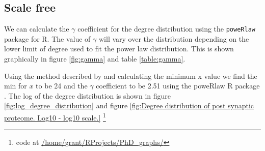 \subsection{Scale free}
We can calculate the $\gamma$ coefficient for the degree distribution using the \texttt{poweRlaw} package for R. The value of $\gamma$ will vary over the distribution depending on the lower limit of degree used to fit the power law distribution. This is shown graphically in figure \ref{fig:gamma} and table \ref{table:gamma}.

Using the method described by \cite{clauset2009power} and calculating the minimum x value we find the min for $x$ to be 24 and the $\gamma$ coefficient to be 2.51 using the poweRlaw R package \cite{gillespie2015fitting}. The log of the degree distribution is shown in figure \ref{fig:log_degree_distribution} and figure \ref{fig:Degree distribution of post synaptic proteome. Log10 - log10 scale.}
\footnote{code at \url{/home/grant/RProjects/PhD_graphs/}}




